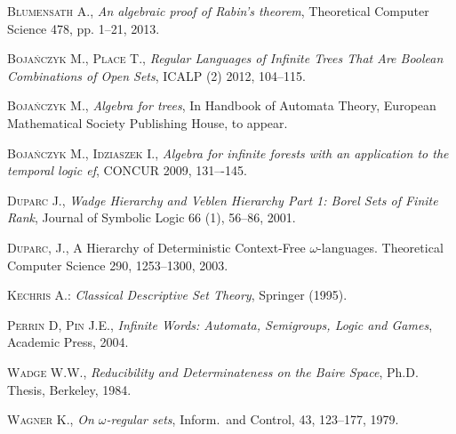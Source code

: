 \begin{thebibliography}{00}

\textsc{Blumensath} A., \emph{An algebraic proof of Rabin’s theorem}, Theoretical Computer Science \textsc{478}, pp. 1--21, 2013.

\textsc{Boja\'nczyk} M., \textsc{Place} T., \emph{Regular Languages of Infinite Trees That Are Boolean Combinations of Open Sets}, ICALP (2) \textsc{2012}, 104--115.

\textsc{Boja\'nczyk} M., \emph{Algebra for trees}, In Handbook of Automata Theory, European
Mathematical Society Publishing House, to appear.

\textsc{Boja\'nczyk} M., \textsc{Idziaszek} I., \emph{Algebra for infinite forests with an
application to the temporal logic ef}, CONCUR \textsc{2009}, 131–-145.



\textsc{Duparc} J., \emph{Wadge Hierarchy and Veblen Hierarchy Part 1: Borel Sets of Finite Rank}, Journal of Symbolic Logic \textsc{66} (1), 56--86, 2001.


\textsc{Duparc}, J., A Hierarchy of Deterministic Context-Free $\omega$-languages.
Theoretical Computer Science \textsc{290}, 1253--1300, 2003.



\textsc{Kechris} A.: \emph{Classical Descriptive Set Theory}, Springer (1995).


\textsc{Perrin} D, \textsc{Pin} J.E., \emph{Infinite Words: Automata, Semigroups, Logic and Games}, Academic Press, \textsc{2004}.

\textsc{Wadge} W.W., \emph{Reducibility and Determinateness on the Baire Space}, Ph.D. Thesis, Berkeley, \textsc{1984}.

\textsc{Wagner} K., \emph{On $\omega$-regular sets}, Inform.~and Control, \textsc{43}, 123--177, 1979. 

\end{thebibliography}
